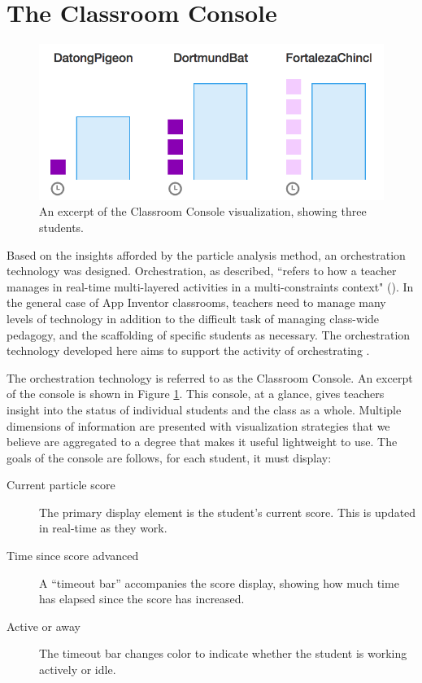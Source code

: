 \section{The Classroom Console}
\label{sec:classroom-console}

\begin{figure}
  \centering
      \includegraphics{images/ch4-console-demo}
  \caption[Excerpt of the Classroom Console]{An excerpt of the Classroom Console visualization, showing three students.}
  \label{fig:console-demo}
\end{figure}


Based on the insights afforded by the particle analysis method, an orchestration technology was designed. Orchestration, as \citeauthor{dillenbourg2012design} described, ``refers to how a teacher manages in real-time multi-layered activities in a multi-constraints context" (\citeyear{dillenbourg2012design}). In the general case of App Inventor classrooms, teachers need to manage many levels of technology in addition to the difficult task of managing class-wide pedagogy, and the scaffolding of specific students as necessary. The orchestration technology developed here aims to support the activity of orchestrating \citep{tchounikine2013clarifying}.

The orchestration technology is referred to as the Classroom Console. An excerpt of the console is shown in Figure \ref{fig:console-demo}. This console, at a glance, gives teachers insight into the status of individual students and the class as a whole. Multiple dimensions of information are presented with visualization strategies that we believe are aggregated to a degree that makes it useful lightweight to use. The goals of the console are follows, for each student, it must display:

\begin{description}
\item [Current particle score] The primary display element is the student's current score. This is updated in real-time as they work.
\item [Time since score advanced] A ``timeout bar'' accompanies the score display, showing how much time has elapsed since the score has increased.
\item [Active or away] The timeout bar changes color to indicate whether the student is working actively or idle.
\end{description}

